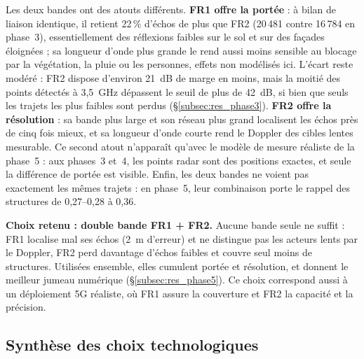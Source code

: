 \documentclass[12pt,a4paper,titlepage]{article}
\begin{document}
Les deux bandes ont des atouts différents. \textbf{FR1 offre la portée} : à bilan de liaison identique, il retient 22\,\% d'échos de plus que FR2 (20\,481 contre 16\,784 en phase~3), essentiellement des réflexions faibles sur le sol et sur des façades éloignées ; sa longueur d'onde plus grande le rend aussi moins sensible au blocage par la végétation, la pluie ou les personnes, effets non modélisés ici. L'écart reste modéré : FR2 dispose d'environ 21~dB de marge en moins, mais la moitié des points détectés à 3,5~GHz dépassent le seuil de plus de 42~dB, si bien que seuls les trajets les plus faibles sont perdus (\S\ref{subsec:res_phase3}). \textbf{FR2 offre la résolution} : sa bande plus large et son réseau plus grand localisent les échos près de cinq fois mieux, et sa longueur d'onde courte rend le Doppler des cibles lentes mesurable. Ce second atout n'apparaît qu'avec le modèle de mesure réaliste de la phase~5 : aux phases~3 et~4, les points radar sont des positions exactes, et seule la différence de portée est visible. Enfin, les deux bandes ne voient pas exactement les mêmes trajets : en phase~5, leur combinaison porte le rappel des structures de 0,27--0,28 à 0,36.

\textbf{Choix retenu : double bande FR1 + FR2.} Aucune bande seule ne suffit : FR1 localise mal ses échos (2~m d'erreur) et ne distingue pas les acteurs lents par le Doppler, FR2 perd davantage d'échos faibles et couvre seul moins de structures. Utilisées ensemble, elles cumulent portée et résolution, et donnent le meilleur jumeau numérique (\S\ref{subsec:res_phase5}). Ce choix correspond aussi à un déploiement 5G réaliste, où FR1 assure la couverture et FR2 la capacité et la précision.

\subsection{Synthèse des choix technologiques}
\end{document}
